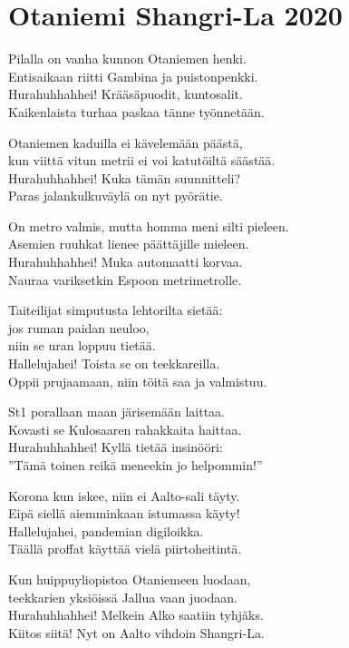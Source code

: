 \section{Otaniemi Shangri-La 2020}

Pilalla on vanha kunnon Otaniemen henki.\\
Entisaikaan riitti Gambina ja puistonpenkki.\\
Hurahuhhahhei! Krääsäpuodit, kuntosalit.\\
Kaikenlaista turhaa paskaa tänne työnnetään.

Otaniemen kaduilla ei kävelemään päästä,\\
kun viittä vitun metrii ei voi katutöiltä säästää.\\
Hurahuhhahhei! Kuka tämän suunnitteli?\\
Paras jalankulkuväylä on nyt pyörätie.

On metro valmis, mutta homma meni silti pieleen.\\
Asemien ruuhkat lienee päättäjille mieleen.\\
Hurahuhhahhei! Muka automaatti korvaa.\\
Nauraa variksetkin Espoon metrimetrolle.

Taiteilijat simputusta lehtorilta sietää:\\
jos ruman paidan neuloo,\\
niin se uran loppuu tietää.\\
Hallelujahei! Toista se on teekkareilla.\\
Oppii prujaamaan, niin töitä saa ja valmistuu.

St1 porallaan maan järisemään laittaa.\\
Kovasti se Kulosaaren rahakkaita haittaa.\\
Hurahuhhahhei! Kyllä tietää insinööri:\\
”Tämä toinen reikä meneekin jo helpommin!”

Korona kun iskee, niin ei Aalto-sali täyty.\\
Eipä siellä aiemminkaan istumassa käyty!\\
Hallelujahei, pandemian digiloikka.\\
Täällä proffat käyttää vielä piirtoheitintä.

Kun huippuyliopistoa Otaniemeen luodaan,\\
teekkarien yksiöissä Jallua vaan juodaan.\\
Hurahuhhahhei! Melkein Alko saatiin tyhjäks.\\
Kiitos siitä! Nyt on Aalto vihdoin Shangri-La.
